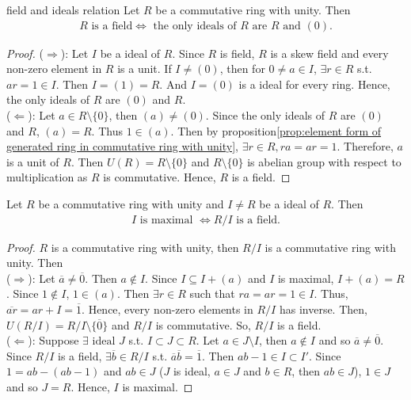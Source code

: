 \begin{proposition}{}{field and ideals relation}
    Let $R$ be a commutative ring with unity. Then
    \begin{align*}
        R \text{ is a field}\Leftrightarrow \text{ the only ideals of } R \text{ are } R \text{ and } (0).
    \end{align*}
\end{proposition}
\begin{proof}
    ($\Rightarrow$): Let $I$ be a ideal of $R$. 
    Since $R$ is field, $R$ is a skew field and every non-zero element in $R$ is a unit.
    If $I\neq (0)$,
    then for $0\neq a\in I$, $\exists r\in R$ s.t. $ar=1\in I$. Then $I=(1)=R$. 
    And $I=(0)$ is a ideal for every ring. Hence, the only ideals of $R$ are $(0)$ and $R$.\\
    ($\Leftarrow$):
    Let $a\in R\setminus \{0\}$, then $(a)\neq (0)$. Since the only ideals of $R$ are $(0)$ and $R$, $(a)=R$.
    Thus $1\in (a)$. Then by proposition\ref{prop:element form of generated ring in commutative ring with unity}, 
    $\exists r\in R, ra=ar=1$. Therefore, $a$ is a unit of $R$. Then $U(R)=R\setminus \{0\}$ and $R\setminus \{0\}$
    is abelian group with respect to multiplication as $R$ is commutative. Hence, $R$ is a field. 
\end{proof}


\begin{proposition}{}{}
    Let $R$ be a commutative ring with unity and $I\neq R$ be a ideal of $R$. Then
    \begin{align*}
        I \text{ is maximal }\Leftrightarrow R/I \text{ is a field}.  
    \end{align*}
\end{proposition}

\begin{proof}
    $R$ is a commutative ring with unity, then $R/I$ is a commutative ring with unity. Then\\
    ($\Rightarrow$): Let $\overline{a}\neq \overline{0}$. 
    Then $a\notin I$. Since $I\subseteq I+(a)$ and $I$ is maximal, $I+(a)=R$.
    Since $1\notin I$, $1\in (a)$. Then $\exists r\in R$ such that $ra=ar=1\in I$. 
    Thus, $\overline{ar}=ar+I=\overline{1}$. Hence, every non-zero elements in $R/I$ has inverse.
    Then, $U(R/I)=R/I\setminus\{\overline{0}\}$ and $R/I$ is commutative. So, $R/I$ is a field.\\
    ($\Leftarrow$): Suppose $\exists \text{ ideal } J$ s.t. $I\subset J\subset R$. Let $a\in J\setminus I$, then $a\notin I$ and so $\overline{a}\neq \overline{0}$.
    Since $R/I$ is a field, $\exists \overline{b}\in R/I$ s.t. $\overline{a}\overline{b}=\overline{1}$. Then $ab-1\in I\subset I'$.
    Since $1=ab-(ab-1)$ and $ab\in J$ ($J$ is ideal, $a\in J$ and $b\in R$, then $ab\in J$), $1\in J$ and so $J=R$.
    Hence, $I$ is maximal. 
\end{proof}

